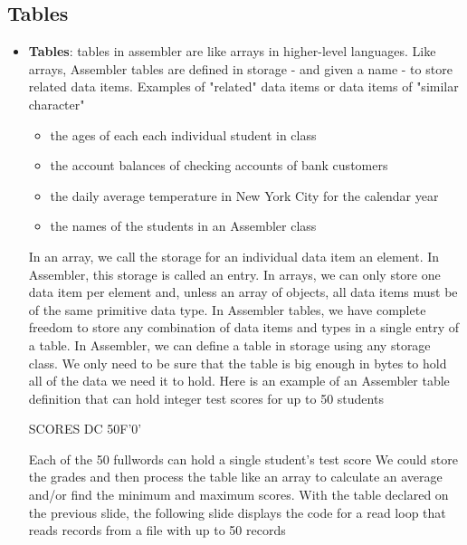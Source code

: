 \documentclass{report}
\begin{document}
    \pagebreak 
    \subsection{Tables}
    \begin{itemize}
        \item \textbf{Tables}: tables in assembler are like arrays in higher-level languages. Like arrays, Assembler tables are defined in storage - and given a name - to store related data items.
            \bigbreak \noindent 
            Examples of "related" data items or data items of "similar character"
            \begin{itemize}
                \item the ages of each each individual student in class
                \item the account balances of checking accounts of bank customers
                \item the daily average temperature in New York City for the calendar year
                \item the names of the students in an Assembler class
            \end{itemize}
            \bigbreak \noindent 
            In an array, we call the storage for an individual data item an element. In Assembler, this storage is called an entry. In arrays, we can only store one data item per element and, unless an array of objects, all data items must be of the same primitive data type. In Assembler tables, we have complete freedom to store any combination of data items and types in a single entry of a table.
            \bigbreak \noindent 
            In Assembler, we can define a table in storage using any storage class. We only need to be sure that the table is big enough in bytes to hold all of the data we need it to hold.
            \bigbreak \noindent 
            Here is an example of an Assembler table definition that can hold integer test scores for up to 50 students
            \bigbreak \noindent 
            \begin{cppcode}
            SCORES DC 50F'0'
            \end{cppcode}
            \bigbreak \noindent 
            Each of the 50 fullwords can hold a single student's test score
            \bigbreak \noindent 
            We could store the grades and then process the table like an array to calculate an average and/or find the minimum and maximum scores.
            \bigbreak \noindent 
            With the table declared on the previous slide, the following slide displays the code for a read loop that reads records from a file with up to 50 records

\end{itemize}
\end{document}

